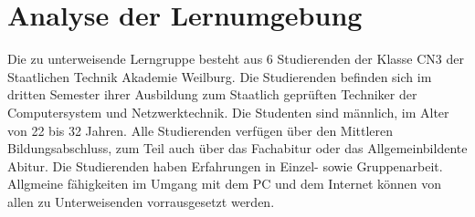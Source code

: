 \chapter{Analyse der Lernumgebung }  %
\label{chapter:Analyse der Lernumgebung}  %

Die zu unterweisende Lerngruppe besteht aus 6 Studierenden der Klasse CN3 der Staatlichen Technik Akademie Weilburg. Die Studierenden befinden sich im dritten Semester ihrer Ausbildung zum Staatlich geprüften Techniker der Computersystem und Netzwerktechnik. 
Die Studenten sind männlich, im Alter von 22 bis 32 Jahren.
Alle Studierenden verfügen über den Mittleren Bildungsabschluss, zum Teil auch über das Fachabitur oder das  Allgemeinbildente Abitur.
Die Studierenden haben Erfahrungen in Einzel- sowie Gruppenarbeit. 
Allgmeine fähigkeiten im Umgang mit dem PC und dem Internet können von allen zu Unterweisenden vorrausgesetzt werden.

